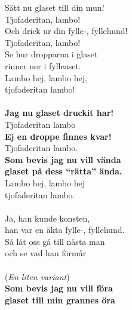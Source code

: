 \vspace{10pt}
Sätt nu glaset till din mun!\\
Tjofaderitan, lambo!\\
Och drick ur din fylle-, fyllehund!\\
Tjofaderitan, lambo!\\
Se hur dropparna i glaset\\
rinner ner i fylleaset.\\
Lambo hej, lambo hej, \\
tjofaderitan lambo!\\
\\
\textbf{Jag nu glaset druckit har!}\\
Tjofaderitan lambo\\
\textbf{Ej en droppe finnes kvar!}\\
Tjofaderitan lambo.\\
\textbf{Som bevis jag nu vill vända\\
glaset på dess ``rätta'' ända.}\\
Lambo hej, lambo hej\\
tjofaderitan lambo.\\
\\
Ja, han kunde konsten,\\
han var en äkta fylle-, fyllehund.\\
Så låt oss gå till nästa man\\
och se vad han förmår\\
\\
(\textit{En liten variant})\\
\textbf{Som bevis jag nu vill föra\\
glaset till min grannes öra}
